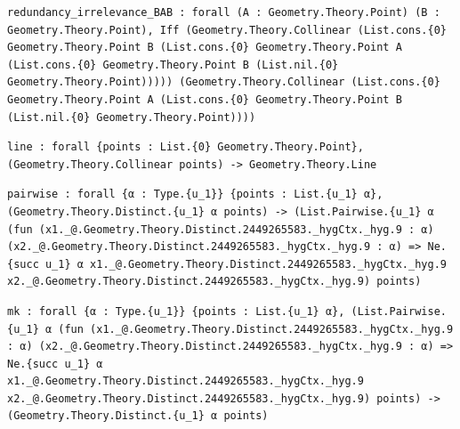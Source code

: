 \begin{theorem}
  \label{Geometry.Theory.Collinear.redundancy_irrelevance_BAB}
  \leanok
\begin{verbatim}redundancy_irrelevance_BAB : forall (A : Geometry.Theory.Point) (B : Geometry.Theory.Point), Iff (Geometry.Theory.Collinear (List.cons.{0} Geometry.Theory.Point B (List.cons.{0} Geometry.Theory.Point A (List.cons.{0} Geometry.Theory.Point B (List.nil.{0} Geometry.Theory.Point))))) (Geometry.Theory.Collinear (List.cons.{0} Geometry.Theory.Point A (List.cons.{0} Geometry.Theory.Point B (List.nil.{0} Geometry.Theory.Point))))\end{verbatim}
\end{theorem}

\begin{definition}
  \label{Geometry.Theory.Collinear.line}
  \leanok
\begin{verbatim}line : forall {points : List.{0} Geometry.Theory.Point}, (Geometry.Theory.Collinear points) -> Geometry.Theory.Line\end{verbatim}
\end{definition}


\begin{theorem}
  \label{Geometry.Theory.Distinct.pairwise}
  \leanok
\begin{verbatim}pairwise : forall {α : Type.{u_1}} {points : List.{u_1} α}, (Geometry.Theory.Distinct.{u_1} α points) -> (List.Pairwise.{u_1} α (fun (x1._@.Geometry.Theory.Distinct.2449265583._hygCtx._hyg.9 : α) (x2._@.Geometry.Theory.Distinct.2449265583._hygCtx._hyg.9 : α) => Ne.{succ u_1} α x1._@.Geometry.Theory.Distinct.2449265583._hygCtx._hyg.9 x2._@.Geometry.Theory.Distinct.2449265583._hygCtx._hyg.9) points)\end{verbatim}
\end{theorem}

\begin{lemma}
  \label{Geometry.Theory.Distinct.mk}
  \leanok
\begin{verbatim}mk : forall {α : Type.{u_1}} {points : List.{u_1} α}, (List.Pairwise.{u_1} α (fun (x1._@.Geometry.Theory.Distinct.2449265583._hygCtx._hyg.9 : α) (x2._@.Geometry.Theory.Distinct.2449265583._hygCtx._hyg.9 : α) => Ne.{succ u_1} α x1._@.Geometry.Theory.Distinct.2449265583._hygCtx._hyg.9 x2._@.Geometry.Theory.Distinct.2449265583._hygCtx._hyg.9) points) -> (Geometry.Theory.Distinct.{u_1} α points)\end{verbatim}
\end{lemma}

